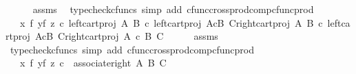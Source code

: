 \begin{isabellebody}
\ \ \ \ \isamarkupfalse%
\ assms\ \isamarkupfalse%
\ {\isacharparenleft}{\kern0pt}typecheck{\isacharunderscore}{\kern0pt}cfuncs{\isacharcomma}{\kern0pt}\ simp\ add{\isacharcolon}{\kern0pt}\ cfunc{\isacharunderscore}{\kern0pt}cross{\isacharunderscore}{\kern0pt}prod{\isacharunderscore}{\kern0pt}comp{\isacharunderscore}{\kern0pt}cfunc{\isacharunderscore}{\kern0pt}prod{\isacharparenright}{\kern0pt}\isanewline
\ \ \isamarkupfalse%
\ \isamarkupfalse%
\ {\isachardoublequoteopen}{\isachardot}{\kern0pt}{\isachardot}{\kern0pt}{\isachardot}{\kern0pt}\ {\isacharequal}{\kern0pt}\ {\isacharparenleft}{\kern0pt}x\ {\isasymtimes}\isactrlsub f\ {\isacharparenleft}{\kern0pt}y{\isasymtimes}\isactrlsub f\ z{\isacharparenright}{\kern0pt}{\isacharparenright}{\kern0pt}\ {\isasymcirc}\isactrlsub c\ {\isasymlangle}left{\isacharunderscore}{\kern0pt}cart{\isacharunderscore}{\kern0pt}proj\ A\ B\ {\isasymcirc}\isactrlsub c\ left{\isacharunderscore}{\kern0pt}cart{\isacharunderscore}{\kern0pt}proj\ {\isacharparenleft}{\kern0pt}A{\isasymtimes}\isactrlsub cB{\isacharparenright}{\kern0pt}\ C{\isacharcomma}{\kern0pt}{\isasymlangle}right{\isacharunderscore}{\kern0pt}cart{\isacharunderscore}{\kern0pt}proj\ A\ B\ {\isasymcirc}\isactrlsub c\ left{\isacharunderscore}{\kern0pt}cart{\isacharunderscore}{\kern0pt}proj\ {\isacharparenleft}{\kern0pt}A{\isasymtimes}\isactrlsub cB{\isacharparenright}{\kern0pt}\ C{\isacharcomma}{\kern0pt}right{\isacharunderscore}{\kern0pt}cart{\isacharunderscore}{\kern0pt}proj\ {\isacharparenleft}{\kern0pt}A\ {\isasymtimes}\isactrlsub c\ B{\isacharparenright}{\kern0pt}\ C{\isasymrangle}{\isasymrangle}{\isachardoublequoteclose}\isanewline
\ \ \ \ \isamarkupfalse%
\ assms\ \isamarkupfalse%
\ {\isacharparenleft}{\kern0pt}typecheck{\isacharunderscore}{\kern0pt}cfuncs{\isacharcomma}{\kern0pt}\ simp\ add{\isacharcolon}{\kern0pt}\ cfunc{\isacharunderscore}{\kern0pt}cross{\isacharunderscore}{\kern0pt}prod{\isacharunderscore}{\kern0pt}comp{\isacharunderscore}{\kern0pt}cfunc{\isacharunderscore}{\kern0pt}prod{\isacharparenright}{\kern0pt}\isanewline
\ \ \isamarkupfalse%
\ \isamarkupfalse%
\ {\isachardoublequoteopen}{\isachardot}{\kern0pt}{\isachardot}{\kern0pt}{\isachardot}{\kern0pt}\ {\isacharequal}{\kern0pt}\ {\isacharparenleft}{\kern0pt}x\ {\isasymtimes}\isactrlsub f\ {\isacharparenleft}{\kern0pt}y{\isasymtimes}\isactrlsub f\ z{\isacharparenright}{\kern0pt}{\isacharparenright}{\kern0pt}\ {\isasymcirc}\isactrlsub c\ \ associate{\isacharunderscore}{\kern0pt}right\ A\ B\ C{\isachardoublequoteclose}\ \ \ \isanewline

\end{isabellebody}
